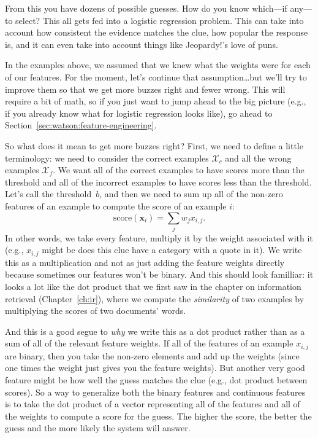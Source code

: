From this you have dozens of possible guesses.  How do you know which---if
any—to select?  This all gets fed into a logistic regression problem.  This
can take into account how consistent the evidence matches the clue, how
popular the response is, and it can even take into account things like
Jeopardy!’s love of puns.

In the examples above, we assumed that we knew what the weights were for each
of our features.
%
For the moment, let's continue that assumption\dots but we'll try to improve
them so that we get more buzzes right and fewer wrong.
%
This will require a bit of math, so if you just want to jump ahead to the big
picture (e.g., if you already know what  for logistic regression
looks like), go ahead to Section~\ref{sec:watson:feature-engineering}.

So what does it mean to get more buzzes right?  First, we need to define a
little terminology: we need to consider the correct examples $\mathcal{X}_c$
and all the wrong examples $\mathcal{X}_f$.
%
We want all of the correct examples to have scores more than the threshold and
all of the incorrect examples to have scores less than the threshold.
%
Let's call the threshold~$b$, and then we need to sum up all of the non-zero
features of an example to compute the score of an example $i$:
\begin{equation}
  \mbox{score}({\bm x}_i) = \sum_{j} w_j x_{i,j}.
  \label{eq:lr-dot}
\end{equation}
In other words, we take every feature, multiply it by the weight associated
with it (e.g., $x_{i,j}$ might be does this clue have a category with a quote
in it).
%
We write this as a multiplication and not as just adding the feature weights
directly because sometimes our features won't be binary.
%
And this should look familliar: it looks a lot like the dot product that we
first saw in the chapter on information retrieval
(Chapter~\ref{ch:ir}), where we compute the \emph{similarity} of
two examples by multiplying the \tfidf{} scores of two documents' words.

And this is a good segue to \emph{why} we write this as a dot product rather
than as a sum of all of the relevant feature weights.
%
If all of the features of an example $x_{i,j}$ are binary, then you take the
non-zero elements and add up the weights (since one times the weight just
gives you the feature weights).
%
But another very good feature might be how well the guess matches the clue
(e.g., dot product between \tfidf{} scores).
%
So a way to generalize both the binary features and continuous features is to
take the dot product of a vector representing all of the features and all of
the weights to compute a score for the guess.
%
The higher the score, the better the guess and the more likely the system will
answer.

